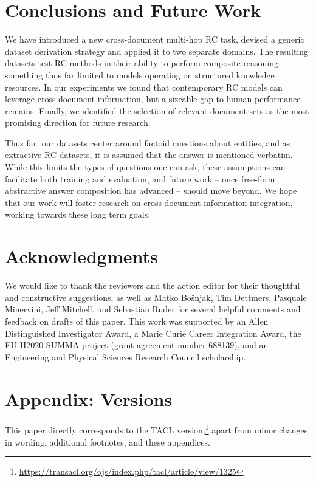\documentclass[11pt,letterpaper]{article}
\begin{document}
\section{Conclusions and Future Work}
We have introduced a new cross-document multi-hop RC task, devised a generic dataset derivation strategy and applied it to two separate domains.
The resulting datasets test RC methods in their ability to perform composite reasoning -- something thus far limited to models operating on structured knowledge resources.
In our experiments we found that contemporary RC models can leverage cross-document information, but a sizeable gap to human performance remains.
Finally, we identified the selection of relevant document sets as the most promising direction for future research.


Thus far, our datasets center around factoid questions about entities, and as extractive RC datasets, it is assumed that the answer is mentioned verbatim.
While this limits the types of questions one can ask, these assumptions can facilitate both training and evaluation, 
and future work -- once free-form abstractive answer composition has advanced -- should move beyond. 
We hope that our work will foster research on cross-document information integration, working towards these long term goals.




\section*{Acknowledgments}
We would like to thank the reviewers and the action editor for their thoughtful and constructive suggestions, as well as Matko Bo\v{s}njak, Tim Dettmers, Pasquale Minervini, Jeff Mitchell, and Sebastian Ruder for several helpful comments and feedback on drafts of this paper.
This work was supported by an Allen Distinguished Investigator Award, a Marie Curie Career Integration Award, the EU H2020 SUMMA project (grant agreement number 688139), and an Engineering and Physical Sciences Research Council scholarship.








\clearpage


\appendix



\section{Appendix: Versions}
This paper directly corresponds to the TACL version,\footnote{\url{https://transacl.org/ojs/index.php/tacl/article/view/1325}} apart from minor changes in wording, additional footnotes, and these appendices.
\end{document}
